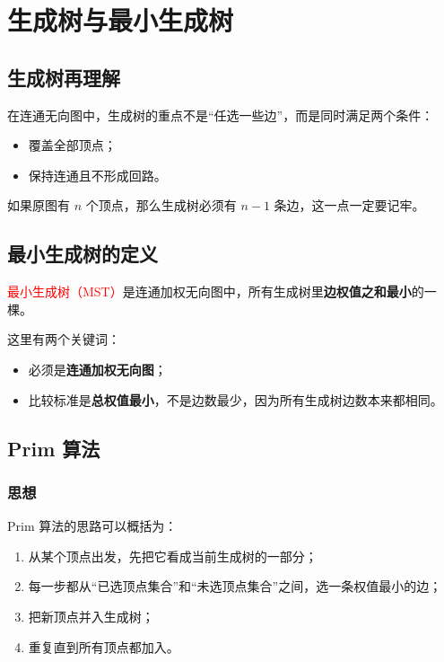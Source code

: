 \documentclass{../../note}
\begin{document}
\section{生成树与最小生成树}

\subsection{生成树再理解}

在连通无向图中，生成树的重点不是“任选一些边”，而是同时满足两个条件：

\begin{itemize}
  \item 覆盖全部顶点；
  \item 保持连通且不形成回路。
\end{itemize}

如果原图有 $n$ 个顶点，那么生成树必须有 $n-1$ 条边，这一点一定要记牢。

\subsection{最小生成树的定义}

\textcolor{red}{最小生成树（MST）}是连通加权无向图中，所有生成树里\textbf{边权值之和最小}的一棵。

这里有两个关键词：

\begin{itemize}
  \item 必须是\textbf{连通加权无向图}；
  \item 比较标准是\textbf{总权值最小}，不是边数最少，因为所有生成树边数本来都相同。
\end{itemize}

\subsection{Prim 算法}

\subsubsection{思想}

Prim 算法的思路可以概括为：

\begin{enumerate}
  \item 从某个顶点出发，先把它看成当前生成树的一部分；
  \item 每一步都从“已选顶点集合”和“未选顶点集合”之间，选一条权值最小的边；
  \item 把新顶点并入生成树；
  \item 重复直到所有顶点都加入。
\end{enumerate}
\end{document}
